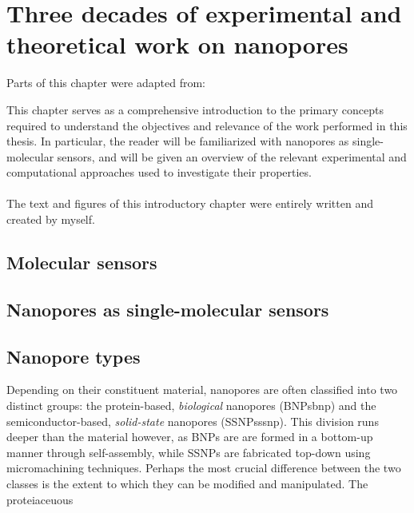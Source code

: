 \chapter{Three decades of experimental and theoretical work on nanopores}\label{ch:introduction}

\begin{shaded}
Parts of this chapter were adapted from:\\
\newpage
\end{shaded}

This chapter serves as a comprehensive introduction to the primary concepts required to understand the
objectives and relevance of the work performed in this thesis. In particular, the reader will be familiarized
with nanopores as single-molecular sensors, and will be given an overview of the relevant experimental and
computational approaches used to investigate their properties. \\
\\
The text and figures of this introductory chapter were entirely written and created by myself.

\newpage



\section{Molecular sensors}
\section{Nanopores as single-molecular sensors}



\section{Nanopore types}

Depending on their constituent material, nanopores are often classified into two distinct groups: the protein-based, \emph{biological} nanopores (BNPs\gls{bnp}) and the semiconductor-based, \emph{solid-state} nanopores (SSNPs\gls{ssnp}).\cite{Dekker-2007} This division runs deeper than the material however, as BNPs are are formed in a bottom-up manner through self-assembly, while SSNPs are fabricated top-down using micromachining techniques. Perhaps the most crucial difference between the two classes is the extent to which they can be modified and manipulated. The proteiaceuous

